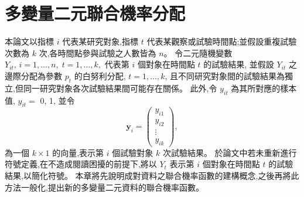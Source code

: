 %
%

\chapter{多變量二元聯合機率分配}\label{ch:dist}
\noindent 本論文以指標 $i$ 代表某研究對象,指標 $t$ 代表某觀察或試驗時間點;並假設重複試驗次數為 $k$ 次,各時間點參與試驗之人數皆為 $n$。
令二元隨機變數 $Y_{it},\,i=1,\ldots,n,\;t=1,\ldots,k,$ 代表第 $i$ 個對象在時間點 $t$ 的試驗結果,
並假設 $Y_{it}$ 之邊際分配為參數 $p_t$ 的白努利分配, $t=1,\ldots,k$, 且不同研究對象間的試驗結果為獨立,但同一研究對象各次試驗結果間可能存在關係。
此外,令 $y_{it}$ 為其所對應的樣本值, $y_{it}=$ 0, 1, 並令
$$\bm{y}_i =\left(
            \begin{array}{c}
             y_{i1} \\
             y_{i2} \\
             \vdots \\
             y_{ik}
            \end{array} \right),$$
為一個 $k \times 1$ 的向量,表示第 $i$ 個試驗對象 $k$ 次試驗結果。
於論文中若未重新進行符號定義,在不造成閱讀困擾的前提下,將以 $Y_t$ 表示第 $i$ 個對象在時間點 $t$ 的試驗結果,以簡化符號。
本章將先說明成對資料之聯合機率函數的建構概念,之後再將此方法一般化,提出新的多變量二元資料的聯合機率函數。

